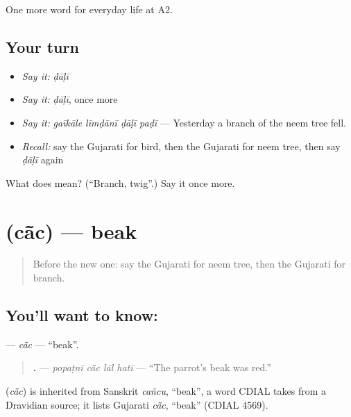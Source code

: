 \begin{grammarlens}[title={What you've built}]
One more word for everyday life at A2.
\end{grammarlens}

\subsection*{Your turn}
\begin{itemize}
\raggedright
  \item \emph{Say it:} \emph{ḍāḷī}
  \item \emph{Say it:} \emph{ḍāḷī}, once more
  \item \emph{Say it:} \emph{gaīkāle līmḍānī ḍāḷī paḍī} — Yesterday a branch of the neem tree fell.
  \item \emph{Recall:} say the Gujarati for bird, then the Gujarati for neem tree, then say \emph{ḍāḷī} again
\end{itemize}

\begin{tcolorbox}[breakable,colback=teal!4,colframe=teal!35!black,title={Before you move on}]
What does  mean? (\textquotedblleft{}Branch, twig\textquotedblright{}.) Say it once more.
\end{tcolorbox}
\section[\texorpdfstring{\gu{ચાંચ} (cā̃c)}{ચાંચ (cā̃c)}]{ (cā̃c) — beak}

\label{lesson:GU-C236-cac}



\begin{quote}
Before the new one: say the Gujarati for neem tree, then the Gujarati for branch.
\end{quote}

\subsection*{You'll want to know: }
\textbf{} — \emph{cā̃c} — \textquotedblleft{}beak\textquotedblright{}.

\begin{quote}
\textbf{   .} — \emph{popaṭnī cā̃c lāl hatī} — \textquotedblleft{}The parrot's beak was red.\textquotedblright{}
\end{quote}

\begin{cousinweb}
\textbf{} (\emph{cā̃c}) is inherited from Sanskrit \emph{cañcu}, \textquotedblleft{}beak\textquotedblright{}, a word CDIAL takes from a Dravidian source; it lists Gujarati \emph{cā̃c}, \textquotedblleft{}beak\textquotedblright{} (CDIAL 4569).
\end{cousinweb}


